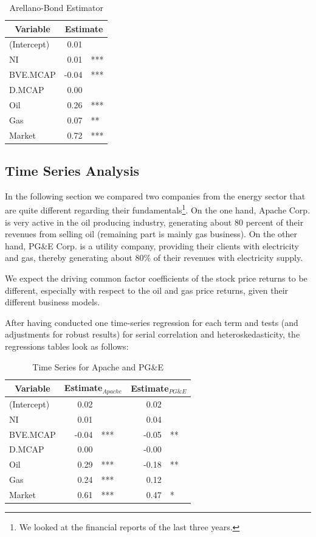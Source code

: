 \documentclass[a4paper]{article}
\begin{document}
\begin{table}[ht]
\centering
\begin{tabular}{l|rl}
\hline
\hline
\multicolumn{1}{c|}{Variable} & \multicolumn{2}{c}{Estimate} \\
\hline
(Intercept) & 0.01 &  \\ 
NI & 0.01 & *** \\ 
BVE.MCAP & -0.04 & *** \\ 
D.MCAP & 0.00 &  \\ 
Oil & 0.26 & *** \\ 
Gas & 0.07 & ** \\ 
Market & 0.72 & *** \\ 
\hline
\hline
\end{tabular}
\label{}
\caption{Arellano-Bond Estimator}
\end{table}

\subsection{Time Series Analysis}

In the following section we compared two companies from the energy sector that are quite different regarding their fundamentals\footnote{We looked at the financial reports of the last three years.}. On the one hand, Apache Corp. is very active in the oil producing industry, generating about 80 percent of their revenues from selling oil (remaining part is mainly gas business). On the other hand, PG\&E Corp. is a utility company, providing their clients with electricity and gas, thereby generating about 80\% of their revenues with electricity supply. 

We expect the driving common factor coefficients of the stock price returns to be different, especially with respect to the oil and gas price returns, given their different business models.

After having conducted one time-series regression for each term and tests (and adjustments for robust results) for serial correlation and heteroskedasticity, the regressions tables look as follows:

\begin{table}[ht]
\centering
\begin{tabular}{l|rl|rl}
\hline
\hline
\multicolumn{1}{c|}{Variable} & \multicolumn{2}{c|}{Estimate$_{Apache}$} & \multicolumn{2}{c}{Estimate$_{PG\&E}$} \\ 
\hline
(Intercept) & 0.02 &  & 0.02 &  \\ 
NI & 0.01 &  & 0.04 &  \\ 
BVE.MCAP & -0.04 & *** & -0.05 & ** \\ 
D.MCAP & 0.00 &  & -0.00 &  \\ 
Oil & 0.29 & *** & -0.18 & ** \\ 
Gas & 0.24 & *** & 0.12 &  \\ 
Market & 0.61 & *** & 0.47 & * \\ 
\hline
\hline
\end{tabular}
\label{}
\caption{Time Series for Apache and PG\&E}
\end{table}
\end{document}
